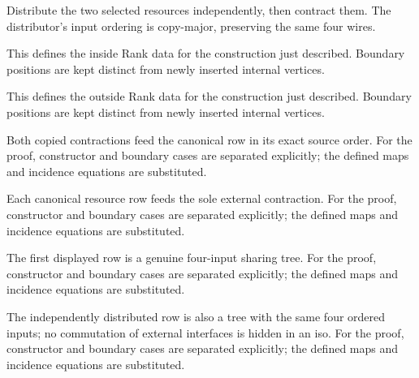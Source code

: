 Distribute the two selected resources independently, then contract them. The distributor's input ordering is copy-major, preserving the same four wires.
\par{}

This defines the inside Rank data for the construction just described. Boundary positions are kept distinct from newly inserted internal vertices.
\par{}

This defines the outside Rank data for the construction just described. Boundary positions are kept distinct from newly inserted internal vertices.
\par{}

Both copied contractions feed the canonical row in its exact source order.
For the proof, constructor and boundary cases are separated explicitly; the defined maps and incidence equations are substituted.
\par{}

Each canonical resource row feeds the sole external contraction.
For the proof, constructor and boundary cases are separated explicitly; the defined maps and incidence equations are substituted.
\par{}

The first displayed row is a genuine four-input sharing tree.
For the proof, constructor and boundary cases are separated explicitly; the defined maps and incidence equations are substituted.
\par{}

The independently distributed row is also a tree with the same four ordered inputs; no commutation of external interfaces is hidden in an iso.
For the proof, constructor and boundary cases are separated explicitly; the defined maps and incidence equations are substituted.
\par{}

